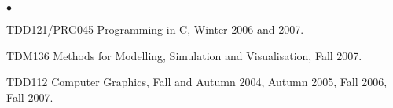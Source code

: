 \documentclass[a4paper,margin,line]{res} \usepackage{latexsym}
\newenvironment{list2}{
  \begin{list}{$\bullet$}{%
      \setlength{\itemsep}{0in} \setlength{\parsep}{0in}
      \setlength{\parskip}{0in} \setlength{\topsep}{0in}
      \setlength{\partopsep}{0in}
      \setlength{\leftmargin}{0.2in}}}{\end{list}}
\begin{document}
\begin{resume}
\vspace*{.05in}
\begin{list2}
\item TDD121/PRG045 Programming in C, Winter 2006 and 2007.
\item TDM136 Methods for Modelling, Simulation and Visualisation, Fall
  2007.
\item TDD112 Computer Graphics, Fall and Autumn 2004, Autumn 2005,
  Fall 2006, Fall 2007.
\end{list2}







\end{resume}
\end{document}
